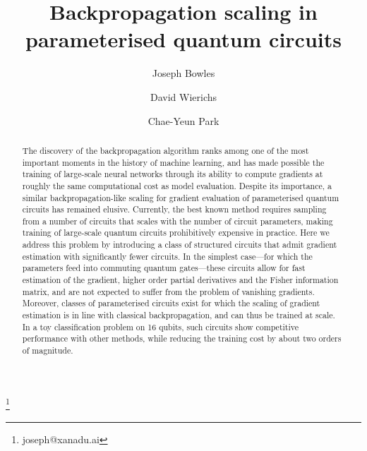 \documentclass[twocolumn]{revtex4-2}
\begin{document}
\title{\textbf{Backpropagation scaling in parameterised quantum circuits}}


\author{Joseph Bowles}\thanks{joseph@xanadu.ai}
\author{David Wierichs}
\author{Chae-Yeun Park}





\begin{abstract}
    The discovery of the backpropagation algorithm ranks among one of the most important moments in the history of machine learning, and has made possible the training of large-scale neural networks through its ability to compute gradients at roughly the same computational cost as model evaluation. Despite its importance, a similar backpropagation-like scaling for gradient evaluation of parameterised quantum circuits has remained elusive. Currently, the best known method requires sampling from a number of circuits that scales with the number of circuit parameters,
    making training of large-scale quantum circuits prohibitively expensive in practice. Here we address this problem by introducing a class of structured circuits that admit gradient estimation with significantly fewer circuits. 
    In the simplest case---for which the parameters feed into commuting quantum gates---these circuits allow for fast estimation of the gradient, higher order partial derivatives and the Fisher information matrix, and are not expected to suffer from the problem of vanishing gradients. Moreover, classes of parameterised circuits exist for which the scaling of gradient estimation is in line with classical backpropagation, and can thus be trained at scale.
    In a toy classification problem on 16 qubits, such circuits show competitive performance with other methods, while reducing the training cost by about two orders of magnitude.



\end{abstract}
\end{document}
